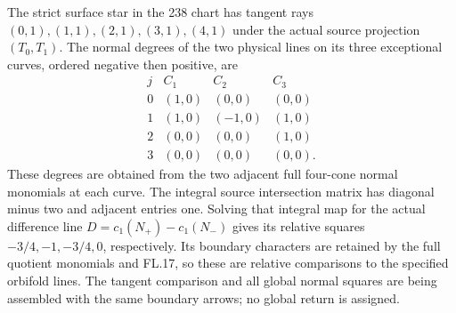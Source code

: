 The strict surface star in the 238 chart has tangent
rays \((0,1),(1,1),(2,1),(3,1),(4,1)\) under the
actual source projection \((T_0,T_1)\). The normal
degrees of the two physical lines on its three
exceptional curves, ordered negative then positive,
are
\[
\begin{array}{c|ccc}
 j& C_1&C_2&C_3\\ \hline
 0&(1,0)&(0,0)&(0,0)\\
 1&(1,0)&(-1,0)&(1,0)\\
 2&(0,0)&(0,0)&(1,0)\\
 3&(0,0)&(0,0)&(0,0).
\end{array}
 \tag{FL.21}
\]
These degrees are obtained from the two adjacent
full four-cone normal monomials at each curve.
The integral source intersection matrix has diagonal
minus two and adjacent entries one. Solving that
integral map for the actual difference line
\(D=c_1(N_+)-c_1(N_-)\) gives its relative squares
\(-3/4,-1,-3/4,0\), respectively. Its boundary
characters are retained by the full quotient
monomials and FL.17, so these are relative
comparisons to the specified orbifold lines.
The tangent comparison and all global normal
squares are being assembled with the same
boundary arrows; no global return is assigned.

